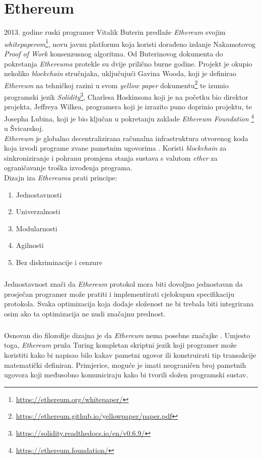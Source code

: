 \documentclass[times, utf8, zavrsni, numeric]{fer}
\begin{document}
\chapter{Ethereum}
2013. godine ruski programer Vitalik Buterin predlaže \emph{Ethereum} svojim \emph{whitepaperom}\footnote{\url{https://ethereum.org/whitepaper/}}, novu javnu platformu koja koristi 
dorađeno izdanje Nakamotovog \emph{Proof of Work} konsenzusnog algoritma.
Od Buterinovog dokumenta do pokretanja \emph{Ethereuma} protekle su dvije prilično burne godine. Projekt je okupio nekoliko \emph{blockchain} stručnjaka, uključujući
Gavina Wooda, koji je definirao \emph{Ethereum} na tehničkoj razini u svom \emph{yellow paper} dokumentu\footnote{\url{https://ethereum.github.io/yellowpaper/paper.pdf}} te
izumio programski jezik \emph{Solidity}\footnote{\url{https://solidity.readthedocs.io/en/v0.6.9/}}, Charlesa Hoskinsona koji je na početku bio direktor projekta, Jeffreya
Wilkea, programera koji je izrazito puno doprinio projektu, te Josepha Lubina, koji je bio ključan u pokretanju zaklade \emph{Ethereum Foundation}
\footnote{\url{https://ethereum.foundation/}} u Švicarskoj.\citep{ffzg} \\
 \emph{Ethereum} je globalno decentralizirana računalna infrastruktura otvorenog koda koja
izvodi programe zvane pametnim ugovorima . Koristi \emph{blockchain} za sinkroniziranje i pohranu promjena stanja sustava s valutom \emph{ether}
za ograničavanje troška izvođenja programa\citep{masteringEth}. \\
Dizajn iza \emph{Ethereuma} prati principe:

\begin{enumerate}
  \item Jednostavnosti
  \item Univerzalnosti
  \item Modularnosti
  \item Agilnosti
  \item Bez diskriminacije i cenzure
\end{enumerate}

\paragraph{}
Jednostavnost znači da \emph{Ethereum} protokol mora biti dovoljno jednostavan da prosječan programer može pratiti i implementirati cjelokupnu specifikaciju protokola.
Svaka optimizacija koja dodaje složenost ne bi trebala biti integrirana osim ako ta optimizacija ne nudi značajnu prednost.
\paragraph{}
Osnovan dio filozofije dizajna je da \emph{Ethereum} nema posebne značajke . Umjesto toga, \emph{Ethereum} pruža Turing kompletan skriptni jezik koji programer
može koristiti kako bi napisao bilo kakav pametni ugovor ili konstruirati tip transakcije matematički definiran. Primjerice, moguće je imati neograničen broj pametnih ugovora
koji međusobno komuniciraju kako bi tvorili složen programski sustav.
\end{document}
